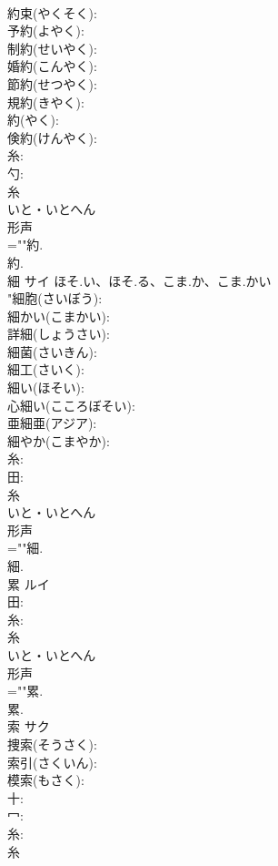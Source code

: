 \documentclass[8pt]{extreport}
\begin{document}
\begin{CJK}{UTF8}{min}
\\	約束(やくそく): 
\\	予約(よやく): 
\\	制約(せいやく): 
\\	婚約(こんやく): 
\\	節約(せつやく): 
\\	規約(きやく): 
\\	約(やく): 
\\	倹約(けんやく): 
\\	糸: 
\\	勺: 
\\	糸	
\\	いと・いとへん	
\\	形声 
\\	=""約.
\\	約.
\\	細	サイ	ほそ.い、ほそ.る、こま.か、こま.かい		
\\	"細胞(さいぼう): 
\\	細かい(こまかい): 
\\	詳細(しょうさい): 
\\	細菌(さいきん): 
\\	細工(さいく): 
\\	細い(ほそい): 
\\	心細い(こころぼそい): 
\\	亜細亜(アジア): 
\\	細やか(こまやか): 
\\	糸: 
\\	田: 
\\	糸	
\\	いと・いとへん	
\\	形声 
\\	=""細.
\\	細.
\\	累	ルイ			
\\	田: 
\\	糸: 
\\	糸	
\\	いと・いとへん	
\\	形声 
\\	=""累.
\\	累.
\\	索	サク			
\\	捜索(そうさく): 
\\	索引(さくいん): 
\\	模索(もさく): 
\\	十: 
\\	冖: 
\\	糸: 
\\	糸	

\end{CJK}
\end{document}
